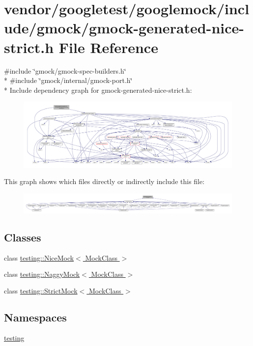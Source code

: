 \hypertarget{gmock-generated-nice-strict_8h}{}\section{vendor/googletest/googlemock/include/gmock/gmock-\/generated-\/nice-\/strict.h File Reference}
\label{gmock-generated-nice-strict_8h}
{\ttfamily \#include \char`\"{}gmock/gmock-\/spec-\/builders.\+h\char`\"{}}\\*
{\ttfamily \#include \char`\"{}gmock/internal/gmock-\/port.\+h\char`\"{}}\\*
Include dependency graph for gmock-\/generated-\/nice-\/strict.h\+:
\nopagebreak
\begin{figure}[H]
\begin{center}
\leavevmode
\includegraphics[width=350pt]{gmock-generated-nice-strict_8h__incl}
\end{center}
\end{figure}
This graph shows which files directly or indirectly include this file\+:
\nopagebreak
\begin{figure}[H]
\begin{center}
\leavevmode
\includegraphics[width=350pt]{gmock-generated-nice-strict_8h__dep__incl}
\end{center}
\end{figure}
\subsection*{Classes}
\begin{DoxyCompactItemize}
\item 
class \hyperlink{classtesting_1_1NiceMock}{testing\+::\+Nice\+Mock$<$ Mock\+Class $>$}
\item 
class \hyperlink{classtesting_1_1NaggyMock}{testing\+::\+Naggy\+Mock$<$ Mock\+Class $>$}
\item 
class \hyperlink{classtesting_1_1StrictMock}{testing\+::\+Strict\+Mock$<$ Mock\+Class $>$}
\end{DoxyCompactItemize}
\subsection*{Namespaces}
\begin{DoxyCompactItemize}
\item 
 \hyperlink{namespacetesting}{testing}
\end{DoxyCompactItemize}
